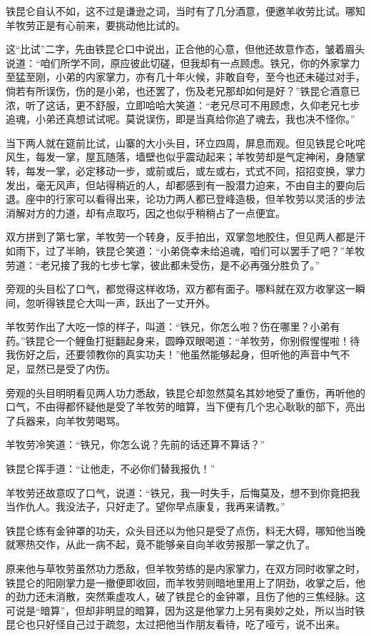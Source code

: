\documentclass[12pt,oneside]{book}
\begin{document}
铁昆仑自认不如，这不过是谦逊之词，当时有了几分酒意，便邀羊收劳比试。哪知羊牧劳正是有心前来，要挑动他比试的。

这``比试''二字，先由铁昆仑口中说出，正合他的心意，但他还故意作态，皱着眉头说道：``咱们所学不同，原应彼此切磋，但我却有一点顾虑。铁兄，你的外家掌力至猛至刚，小弟的内家掌力，亦有几十年火候，非敢自夸，至今也还未碰过对手，倘若有所误伤，伤的是小弟，也还罢了，伤及老兄那却如何是好？''铁昆仑酒意已浓，听了这话，更不舒服，立即哈哈大笑道：``老兄尽可不用顾虑，久仰老兄七步追魂，小弟还真想试试呢。莫说误伤，即是当真给你追了魂去，我也决不怪你。''

当下两人就在筵前比试，山寨的大小头目，环立四周，屏息而观。但见铁昆仑叱咤风生，每发一掌，屋瓦随落，墙壁也似乎震动起来；羊牧劳却是气定神闲，身随掌转，每发一掌，必定移动一步，或前或后，或左或右，式式不同，招招变换，掌力发出，毫无风声，但站得稍近的人，却都感到有一股潜力迫来，不由自主的要向后退。座中的行家可以看得出来，论功力两人都已登峰造极，但羊牧劳以灵活的步法消解对方的力道，却有点取巧，因之也似乎稍稍占了一点便宜。

双方拼到了第七掌，羊牧劳一个转身，反手拍出，双掌忽地胶住，但见两人都是汗如雨下，过了半晌，铁昆仑笑道：``小弟侥幸未给追魂，咱们可以罢手了吧？''羊牧劳道：``老兄接了我的七步七掌，彼此都未受伤，是不必再强分胜负了。''

旁观的头目松了口气，都觉得这样收场，双方都有面子。哪料就在双方收掌这一瞬间，忽听得铁昆仑大叫一声，跃出了一丈开外。

羊牧劳作出了大吃一惊的样子，叫道：``铁兄，你怎么啦？伤在哪里？小弟有药。''铁昆仑一个鲤鱼打挺翻起身来，圆睁双眼喝道：``羊牧劳，你别假惺惺啦！待我伤好之后，还要领教你的真实功夫！''他虽然能够起身，但听他的声音中气不足，显然已是受了内伤。

旁观的头目明明看见两人功力悉敌，铁昆仑却忽然莫名其妙地受了重伤，再听他的口气，不由得都怀疑他是受了羊牧劳的暗算，当下便有几个忠心耿耿的部下，亮出了兵器来，向羊牧劳喝骂。

羊牧劳冷笑道：``铁兄，你怎么说？先前的话还算不算话？''

铁昆仑挥手道：``让他走，不必你们替我报仇！''

羊牧劳还故意叹了口气，说道：``铁兄，我一时失手，后悔莫及，想不到你竟把我当作仇人。我没法子，只好走了。望你早点康复，我再来请教。''

铁昆仑练有金钟罩的功夫，众头目还以为他只是受了点伤，料无大碍，哪知他当晚就寒热交作，从此一病不起，竟不能够亲自向羊收劳报那一掌之仇了。

原来他与草牧劳虽然功力悉敌，但羊牧劳练的是内家掌力，在双方同时收掌之时，铁昆仑的阳刚掌力是一撤便即收回，而羊牧劳则暗地里用上了阴劲，收掌之后，他的劲力还未消散，突然乘虚攻人，破了铁昆仑的金钟罩，且伤了他的三焦经脉。这可说是``暗算''，但却非明显的暗算，因为这是他掌力上另有奥妙之处，所以当时铁昆仑也只好怪自己过于疏忽，太过把他当作朋友看待，吃了哑亏，说不出来。
\end{document}
